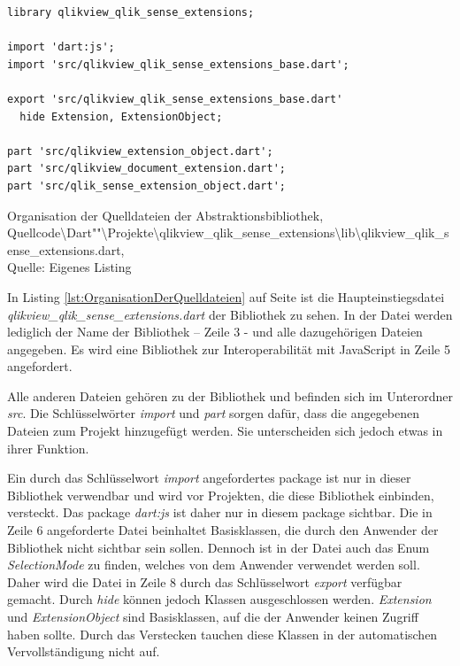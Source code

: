 \ifIncludeFigures\begin{listing}[htbp]
\begin{verbatim}
library qlikview_qlik_sense_extensions;

import 'dart:js';
import 'src/qlikview_qlik_sense_extensions_base.dart';

export 'src/qlikview_qlik_sense_extensions_base.dart'
  hide Extension, ExtensionObject;

part 'src/qlikview_extension_object.dart';
part 'src/qlikview_document_extension.dart';
part 'src/qlik_sense_extension_object.dart';
\end{verbatim}
\caption[Organisation der Quelldateien der Abstraktionsbibliothek]{Organisation der Quelldateien der Abstraktionsbibliothek, Quellcode\textbackslash{}Dart""\textbackslash{}Projekte\textbackslash{}qlikview\_qlik\_sense\_extensions\textbackslash{}lib\textbackslash{}qlikview\_qlik\_sense\_extensions.dart, \\Quelle: Eigenes Listing}
\label{lst:OrganisationDerQuelldateien}
\end{listing}\fi

In Listing \ref{lst:OrganisationDerQuelldateien} auf Seite \pageref{lst:OrganisationDerQuelldateien} ist die Haupteinstiegsdatei \textit{qlikview\_qlik\_sense\_extensions.dart} der Bibliothek zu sehen. In der Datei werden lediglich der Name der Bibliothek – Zeile 3 - und alle dazugehörigen Dateien angegeben. Es wird eine Bibliothek zur Interoperabilität mit JavaScript in Zeile 5 angefordert. 

Alle anderen Dateien gehören zu der Bibliothek und befinden sich im Unterordner \textit{src}. Die Schlüsselwörter \textit{import} und \textit{part} sorgen dafür, dass die angegebenen Dateien zum Projekt hinzugefügt werden. Sie unterscheiden sich jedoch etwas in ihrer Funktion. 

Ein durch das Schlüssel\-wort \textit{import} angefordertes package ist nur in dieser Bibliothek verwendbar und wird vor Projekten, die diese Bibliothek einbinden, versteckt. Das package \textit{dart:js} ist daher nur in diesem package sichtbar. Die in Zeile 6 angeforderte Datei beinhaltet Basisklassen, die durch den Anwender der Bibliothek nicht sichtbar sein sollen. Dennoch ist in der Datei auch das Enum \textit{SelectionMode} zu finden, welches von dem Anwender verwendet werden soll. Daher wird die Datei in Zeile 8 durch das Schlüssel\-wort \textit{export} verfügbar gemacht. Durch \textit{hide} können jedoch Klassen ausgeschlossen werden. \textit{Extension} und \textit{ExtensionObject} sind Basisklassen, auf die der Anwender keinen Zugriff haben sollte. Durch das Verstecken tauchen diese Klassen in der automatischen Vervollständigung nicht auf.

